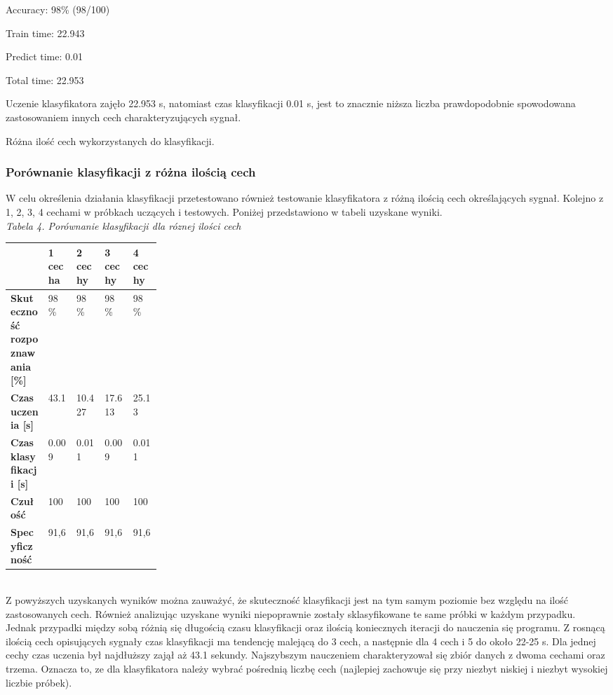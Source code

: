 \documentclass[[10pt,a4paper]{article}
\begin{document}
\begin{enumerate}
\begin{itemize}
\noindent Accuracy: 98\% (98/100)

\noindent Train time:     22.943

\noindent Predict time:   0.01

\noindent Total time:     22.953

\noindent Uczenie klasyfikatora zajęło 22.953 s, natomiast czas klasyfikacji 0.01 s, jest to znacznie niższa liczba prawdopodobnie spowodowana zastosowaniem innych cech charakteryzujących sygnał. 

\noindent Różna ilość cech wykorzystanych do klasyfikacji.

\noindent 

\noindent 

\subsubsection{Porównanie klasyfikacji z różna ilością cech} 
\noindent W celu określenia działania klasyfikacji przetestowano również testowanie klasyfikatora z różną ilością cech określających sygnał. Kolejno z 1, 2, 3, 4 cechami w próbkach uczących i testowych. Poniżej przedstawiono w tabeli uzyskane wyniki.\\
\textit{ Tabela 4. Porównanie klasyfikacji dla róznej ilości cech}
\newline
\begin{tabular}{|p{0.25\linewidth}|p{0.8in}|p{0.8in}|p{0.8in}|p{0.8in}|} \hline 
 & \textbf{1 cecha} & \textbf{2 cechy} & \textbf{3 cechy} & \textbf{4 cechy} \\ \hline 
\textbf{Skuteczność rozpoznawania [\%]} & 98 \% & 98 \% & 98 \% & 98 \% \\ \hline 
\textbf{Czas uczenia [s]} & 43.1 & 10.427 & 17.613 & 25.13 \\ \hline 
\textbf{Czas klasyfikacji [s]} & 0.009 & 0.011 & 0.009 & 0.011 \\ \hline 
\textbf{Czułość} & 100 & 100 & 100 & 100 \\ \hline 
\textbf{Specyficzność} & 91,6 & 91,6 & 91,6 & 91,6 \\ \hline 
\end{tabular}\\



\noindent Z powyższych uzyskanych wyników można zauważyć, że skuteczność klasyfikacji jest na tym samym poziomie bez względu na ilość zastosowanych cech. Również analizując uzyskane wyniki niepoprawnie zostały sklasyfikowane te same próbki w każdym przypadku. Jednak przypadki między sobą różnią się długością czasu klasyfikacji oraz ilością koniecznych iteracji do nauczenia się programu. Z rosnącą ilością cech opisujących sygnały czas klasyfikacji ma tendencję malejącą do 3 cech, a następnie dla 4 cech i 5 do około 22-25 s. Dla jednej cechy czas uczenia był najdłuższy zajął aż 43.1 sekundy. Najszybszym nauczeniem charakteryzował się zbiór danych z dwoma cechami oraz trzema. Oznacza to, ze dla klasyfikatora należy wybrać pośrednią liczbę cech (najlepiej zachowuje się przy niezbyt niskiej i niezbyt wysokiej liczbie próbek). 


\end{itemize}
\end{enumerate}
\end{document}
